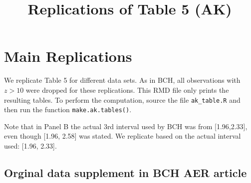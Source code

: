 \documentclass[
]{article}
\title{Replications of Table 5 (AK)}
\author{}
\date{\vspace{-2.5em}}
\begin{document}
\maketitle

\hypertarget{main-replications}{%
\section{Main Replications}\label{main-replications}}

We replicate Table 5 for different data sets. As in BCH, all
observations with \(z>10\) were dropped for these replications. This RMD
file only prints the resulting tables. To perform the computation,
source the file \texttt{ak\_table.R} and then run the function
\texttt{make.ak.tables()}.

Note that in Panel B the actual 3rd interval used by BCH was from
{[}1.96,2.33{]}, even though {[}1.96, 2.58{]} was stated. We replicate
based on the actual interval used: {[}1.96, 2.33{]}.

\hypertarget{orginal-data-supplement-in-bch-aer-article}{%
\subsection{Orginal data supplement in BCH AER
article}\label{orginal-data-supplement-in-bch-aer-article}}
\end{document}
